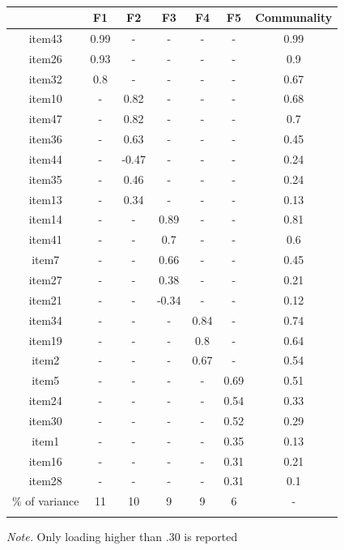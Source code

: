 \documentclass[
  english,
  man]{apa6}
\begin{document}
\begin{table}[tbp]

\begin{center}
\begin{threeparttable}

\caption{\label{tab:TabEFA5}}

\begin{tabular}{ccccccc}
\toprule
 & \multicolumn{1}{c}{F1} & \multicolumn{1}{c}{F2} & \multicolumn{1}{c}{F3} & \multicolumn{1}{c}{F4} & \multicolumn{1}{c}{F5} & \multicolumn{1}{c}{Communality}\\
\midrule
item43 & 0.99 & - & - & - & - & 0.99\\
item26 & 0.93 & - & - & - & - & 0.9\\
item32 & 0.8 & - & - & - & - & 0.67\\
item10 & - & 0.82 & - & - & - & 0.68\\
item47 & - & 0.82 & - & - & - & 0.7\\
item36 & - & 0.63 & - & - & - & 0.45\\
item44 & - & -0.47 & - & - & - & 0.24\\
item35 & - & 0.46 & - & - & - & 0.24\\
item13 & - & 0.34 & - & - & - & 0.13\\
item14 & - & - & 0.89 & - & - & 0.81\\
item41 & - & - & 0.7 & - & - & 0.6\\
item7 & - & - & 0.66 & - & - & 0.45\\
item27 & - & - & 0.38 & - & - & 0.21\\
item21 & - & - & -0.34 & - & - & 0.12\\
item34 & - & - & - & 0.84 & - & 0.74\\
item19 & - & - & - & 0.8 & - & 0.64\\
item2 & - & - & - & 0.67 & - & 0.54\\
item5 & - & - & - & - & 0.69 & 0.51\\
item24 & - & - & - & - & 0.54 & 0.33\\
item30 & - & - & - & - & 0.52 & 0.29\\
item1 & - & - & - & - & 0.35 & 0.13\\
item16 & - & - & - & - & 0.31 & 0.21\\
item28 & - & - & - & - & 0.31 & 0.1\\
\% of variance & 11 & 10 & 9 & 9 & 6 & -\\
\bottomrule
\addlinespace
\end{tabular}

\begin{tablenotes}[para]
\normalsize{\textit{Note.} Only loading higher than .30 is reported}
\end{tablenotes}

\end{threeparttable}
\end{center}

\end{table}
\end{document}
